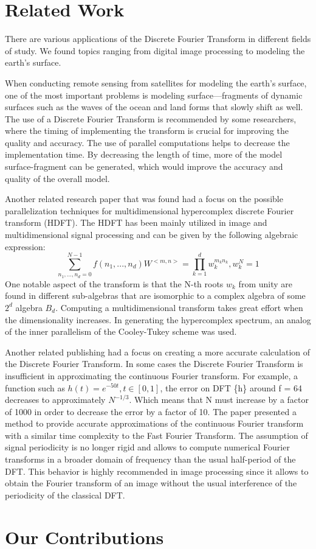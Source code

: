 \documentclass[journal]{IEEEtran}
\begin{document}
\section{Related Work}
\par{There are various applications of the Discrete Fourier Transform in different fields of study. We found topics ranging from digital image processing to modeling the earth's surface.}
\par{When conducting remote sensing from satellites for modeling the earth's surface, one of the most important problems is modeling surface—fragments of dynamic surfaces such as the waves of the ocean and land forms that slowly shift as well. The use of a Discrete Fourier Transform is recommended by some researchers, where the timing of implementing the transform is crucial for improving the quality and accuracy. The use of parallel computations helps to decrease the implementation time. By decreasing the length of time, more of the model surface-fragment can be generated, which would improve the accuracy and quality of the overall model.}
\cite{book:GIS}
\par{Another related research paper that was found had a focus on the possible parallelization techniques for multidimensional hypercomplex discrete Fourier transform (HDFT). The HDFT has been mainly utilized in image and multidimensional signal processing and can be given by the following algebraic expression:
\[ \sum_{n_1,...,n_d=0}^{N-1} f(n_1,...,n_d)W^{<m,n>} = \prod_{k=1}^{d} w_k^{m_kn_k}, w_k^{N} = 1\]
One notable aspect of the transform is that the N-th roots $w_{k}$ from unity are found in different sub-algebras that are isomorphic to a complex algebra of some $2^{d}$ algebra $B_{d}$. Computing a multidimensional transform takes great effort when the dimensionality increases. In generating the hypercomplex spectrum, an analog of the inner parallelism of the Cooley-Tukey scheme was used.}
\cite{Chicheva}
\par{Another related publishing had a focus on creating a more accurate calculation of the Discrete Fourier Transform. In some cases the Discrete Fourier Transform is insufficient in approximating the continuous Fourier transform. For example, a function such as $h (t) = e^{-50t}, t\in [0,1]$, the error on DFT \{h\} around f = 64 decreases to approximately $N^{-1/3}$. Which means that N must increase by a factor of 1000 in order to decrease the error by a factor of 10. The paper presented a method to provide accurate approximations of the continuous Fourier transform with a similar time complexity to the Fast Fourier Transform. The assumption of signal periodicity is no longer rigid and allows to compute numerical Fourier transforms in a broader domain of frequency than the usual half-period of the DFT. This behavior is highly recommended in image processing since it allows to obtain the Fourier transform of an image without the usual interference of the periodicity of the classical DFT.}
\cite{Beaudoin}

\section{Our Contributions}

\medskip


\end{document}
